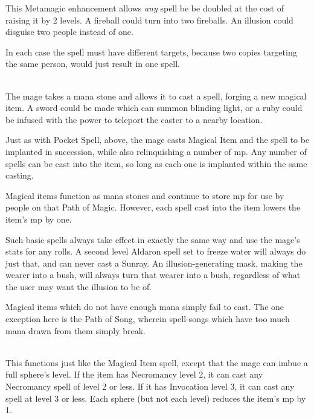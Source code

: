 \begin{multicols}{2}

This Metamagic enhancement allows \emph{any} spell be be doubled at the cost of raising it by 2 levels.
A fireball could turn into two fireballs.
An illusion could disguise two people instead of one.

In each case the spell must have different targets, because two copies targeting the same person, would just result in one spell.

\spelllevel

\\
The mage takes a mana stone and allows it to cast a spell, forging a new magical item. A sword could be made which can summon blinding light, or a ruby could be infused with the power to teleport the caster to a nearby location.

Just as with Pocket Spell, above, the mage casts Magical Item and the spell to be implanted in succession, while also relinquishing a number of \gls{mp}.
Any number of spells can be cast into the item, so long as each one is implanted within the same casting.

Magical items function as mana stones and continue to store \gls{mp} for use by people on that Path of Magic.
However, each spell cast into the item lowers the item's \gls{mp} by one.

Such basic spells always take effect in exactly the same way and use the mage's stats for any rolls. A second level Aldaron spell set to freeze water will always do just that, and can never cast a Sunray. An illusion-generating mask, making the wearer into a bush, will always turn that wearer into a bush, regardless of what the user may want the illusion to be of.

Magical items which do not have enough mana simply fail to cast. The one exception here is the Path of Song, wherein spell-songs which have too much mana drawn from them simply break.

\spelllevel

\\
This functions just like the Magical Item spell, except that the mage can imbue a full sphere's level.
If the item has Necromancy level 2, it can cast any Necromancy spell of level 2 or less.
If it has Invocation level 3, it can cast any spell at level 3 or less.
Each sphere (but not each level) reduces the item's \gls{mp} by 1.



\end{multicols}

